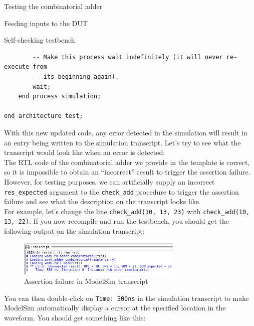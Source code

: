 \documentclass[lab]{course}
\begin{document}
\begin{section}{Testing the combinatorial adder}
\begin{subsection}{Feeding inputs to the DUT}
\begin{subsubsection}{Self-checking testbench}
\begin{lstlisting}
        -- Make this process wait indefinitely (it will never re-execute from
        -- its beginning again).
        wait;
    end process simulation;

end architecture test;
            \end{lstlisting}

            With this new updated code, any error detected in the simulation will result in an entry being written to the simulation transcript. Let's try to see what the transcript would look like when an error is detected: \\

            The RTL code of the combinatorial adder we provide in the template is correct, so it is impossible to obtain an ``incorrect'' result to trigger the assertion failure. However, for testing purposes, we can artificially supply an incorrect \verb+res_expected+ argument to the \verb+check_add+ procedure to trigger the assertion failure and see what the description on the transcript looks like. \\

            For example, let's change the line \verb+check_add(10, 13, 23)+ with \verb+check_add(10, 13, 22)+. If you now recompile and run the testbench, you should get the following output on the simulation transcript:

            \begin{figure}[!h]
                \begin{centering}
                    \includegraphics[width=0.7\textwidth]{figs/waveform_combinatorial_transcript_assertion_failure.png}
                    \caption{Assertion failure in ModelSim transcript}
                    \label{fig:waveform_combinatorial_transcript_assertion_failure}
                \end{centering}
            \end{figure}

            You can then double-click on \verb+Time: 500ns+ in the simulation transcript to make ModelSim automatically display a cursor at the specified location in the waveform. You should get something like this:


\end{subsubsection}
\end{subsection}
\end{section}
\end{document}
